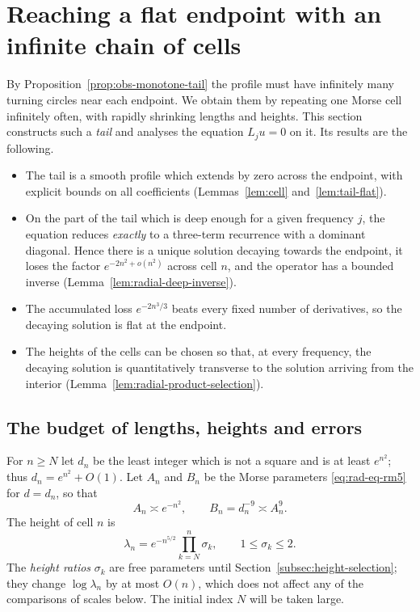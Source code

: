 \section{Reaching a flat endpoint with an infinite chain of cells}
\label{sec:radial-tails}
\label{sec:radial-selection}

By Proposition~\ref{prop:obs-monotone-tail} the profile must have
infinitely many turning circles near each endpoint. We obtain them by
repeating one Morse cell infinitely often, with rapidly shrinking
lengths and heights. This section constructs such a \emph{tail} and
analyses the equation $L_ju=0$ on it. Its results are the following.
\begin{itemize}
\item The tail is a smooth profile which extends by zero across the
 endpoint, with explicit bounds on all coefficients
 (Lemmas~\ref{lem:cell} and~\ref{lem:tail-flat}).
\item On the part of the tail which is deep enough for a given
 frequency $j$, the equation reduces \emph{exactly} to a three-term
 recurrence with a dominant diagonal. Hence there is a unique solution
 decaying towards the endpoint, it loses the factor
 $e^{-2n^2+o(n^2)}$ across cell $n$, and the operator has a bounded
 inverse (Lemma~\ref{lem:radial-deep-inverse}).
\item The accumulated loss $e^{-2n^3/3}$ beats every fixed number of
 derivatives, so the decaying solution is flat at the endpoint.
\item The heights of the cells can be chosen so that, at every
 frequency, the decaying solution is quantitatively transverse to the
 solution arriving from the interior
 (Lemma~\ref{lem:radial-product-selection}).
\end{itemize}

\subsection{The budget of lengths, heights and errors}

For $n\ge N$ let $d_n$ be the least integer which is not a square and
is at least $e^{n^2}$; thus $d_n=e^{n^2}+O(1)$. Let $A_n$ and $B_n$ be
the Morse parameters \eqref{eq:rad-eq-rm5} for $d=d_n$, so that
\[
 A_n\asymp e^{-n^2},\qquad B_n=d_n^{-9}\asymp A_n^9 .
\]
The height of cell $n$ is
\begin{equation}\label{eq:rad-eq-js2}
 \lambda_n=e^{-n^{5/2}}\prod_{k=N}^n\sigma_k,
 \qquad 1\le\sigma_k\le2 .
\end{equation}
The \emph{height ratios} $\sigma_k$ are free parameters until
Section~\ref{subsec:height-selection}; they change $\log\lambda_n$ by
at most $O(n)$, which does not affect any of the comparisons of scales
below. The initial index $N$ will be taken large.

